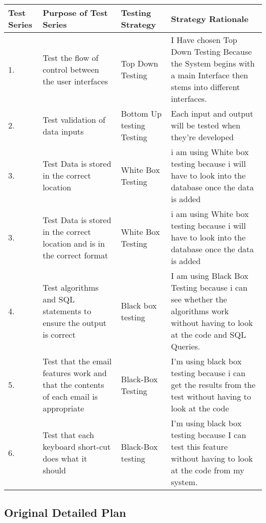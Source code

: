 \begin{landscape}
\begin{center}
    \begin{tabular}{|p{2cm}|p{5cm}|p{5cm}|p{4cm}|}
        \hline
	
	 \textbf{Test Series} & \textbf{Purpose of Test Series} & \textbf{Testing Strategy} & \textbf{Strategy Rationale}\\ \hline
	1. & Test the flow of control between the user interfaces & Top Down Testing & I Have chosen Top Down Testing Because the System begins with a main Interface then stems into different interfaces.\\ \hline
	2. & Test validation of data inputs & Bottom Up testing Testing &  Each input and output will be tested when they're developed \\ \hline
	\rowcolor{dark-grey} 3. & Test Data is stored in the correct location & White Box Testing & i am using White box testing because i will have to look into the database once the data is added \\ \hline
	\rowcolor{light-grey} 3. & Test Data is stored in the correct location and is in the correct format & White Box Testing & i am using White box testing because i will have to look into the database once the data is added \\ \hline
	4. & Test algorithms and SQL statements to ensure the output is correct & Black box testing & I am using Black Box Testing because i can see whether the algorithms work without having to look at the code and SQL Queries. \\ \hline
	\rowcolor{light-grey} 5. & Test that the email features work and that the contents of each email is appropriate & Black-Box Testing & I'm using black box testing because i can get the results from the test without having to look at the code\\ \hline
	\rowcolor{light-grey} 6. & Test that each keyboard short-cut does what it should & Black-Box testing & I'm using black box testing because I can test this feature without having to look at the code from my system.\\ \hline

    \end{tabular}
\end{center}
\end{landscape}

\pagebreak

\subsection{Original Detailed Plan}

